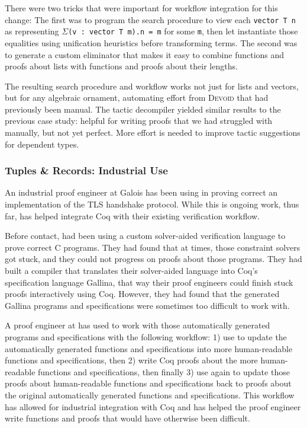 There were two tricks that were important for workflow integration for this change:
The first was to program the search procedure to view each \lstinline{vector T n} as 
representing $\Sigma$\lstinline{(v : vector T m).n = m} for some \lstinline{m},
then let \toolname instantiate those equalities using unification heuristics before transforming terms.
The second was to generate a custom eliminator that makes it
easy to combine functions and proofs about lists with functions and proofs about their lengths.

The resulting search procedure and workflow works not just for lists and vectors, but for any algebraic ornament,
automating effort from \textsc{Devoid} that had previously been manual.
The tactic decompiler yielded similar results to the previous case study: helpful for writing proofs
that we had struggled with manually, but not yet perfect.
More effort is needed to improve tactic suggestions for dependent types.

\subsubsection*{Tuples \& Records: Industrial Use}

An industrial proof engineer at Galois has been using \toolname in proving
correct an implementation of the TLS handshake protocol.
While this is ongoing work, thus far,
\toolname has helped \company integrate Coq with their existing verification workflow.

Before contact, \company had been using a custom solver-aided verification language to prove correct C programs.
They had found that at times, those constraint solvers got stuck, and they could not
progress on proofs about those programs.
They had built a compiler that translates their solver-aided language into Coq's specification language Gallina,
that way their proof engineers could finish stuck proofs interactively using Coq.
However, they had found that the generated Gallina programs and specifications were sometimes too difficult to work with.

A proof engineer at \company has used \toolname to work with those automatically generated programs and specifications
with the following workflow: 1) use \toolname to update the automatically generated functions and specifications into more
human-readable functions and specifications, then 2) write Coq proofs about the more human-readable functions and specifications, then finally
3) use \toolname again to update those proofs about human-readable functions and specifications back to
proofs about the original automatically generated functions and specifications.
This workflow has allowed for industrial integration with Coq and has helped the proof engineer write functions and proofs
that would have otherwise been difficult.

